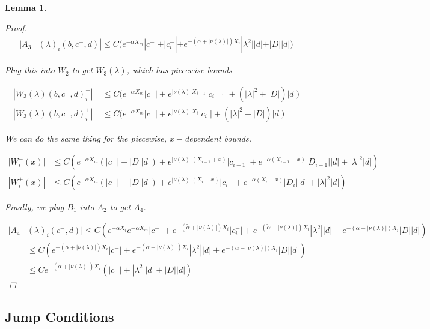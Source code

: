 \documentclass[12pt]{article}
\newtheorem{lemma}{Lemma}
\begin{document}
\begin{lemma}
\begin{proof}
\begin{align*}
|A_3&(\lambda)_i(b, c^-, d)|
\leq C \Big( e^{-\alpha X_m} |c^-| + |c_i^-| + e^{-(\tilde{\alpha}+|\nu(\lambda)|) X_i} |\lambda^2| |d| + |D||d| \Big)
\end{align*} 

Plug this into $W_2$ to get $W_3(\lambda)$, which has piecewise bounds

\begin{align*}
|W_3(\lambda)(b,c^-,d)_i^-|| &\leq C \Big( e^{-\alpha X_m} |c^-| + e^{|\nu(\lambda)|X_{i-1}}|c_{i-1}^-| + (|\lambda|^2 + |D|)|d| \Big) \\
|W_3(\lambda)(b,c^-,d)_i^+|| 
&\leq C \Big( e^{-\alpha X_m} |c^-| + e^{|\nu(\lambda)|X_i}|c_i^-| + (|\lambda|^2 + |D|)|d| \Big)
\end{align*}

We can do the same thing for the piecewise, $x-$dependent bounds.

\begin{align*}
|W_i^-(x)| &\leq C ( e^{-\alpha X_m}( |c^-| + |D||d|) + e^{|\nu(\lambda)|(X_{i-1} + x)} |c_{i-1}^-| + e^{-\tilde{\alpha}(X_{i-1} + x)}|D_{i-1}||d| + |\lambda|^2 |d| ) \\
|W_i^+(x)| &\leq C ( e^{-\alpha X_m}( |c^-| + |D||d|) + e^{|\nu(\lambda)|(X_i - x)} |c_i^-| + e^{-\tilde{\alpha}(X_i - x)}|D_i||d| + |\lambda|^2 |d| )
\end{align*}

Finally, we plug $B_1$ into $A_2$ to get $A_4$.

\begin{align*}
|A_4&(\lambda)_i(c^-, d)| \leq C ( e^{-\alpha X_i} e^{-\alpha X_m}|c^-| + e^{-(\tilde{\alpha} + |\nu(\lambda)|)X_i} |c_i^-| 
+ e^{-(\tilde{\alpha} + |\nu(\lambda)|) X_i} |\lambda^2| |d| + e^{-(\alpha - |\nu(\lambda)|) X_i}|D||d| ) \\
&\leq C ( e^{-(\tilde{\alpha} + |\nu(\lambda)|)X_i} |c^-| 
+ e^{-(\tilde{\alpha} + |\nu(\lambda)|) X_i} |\lambda^2| |d| + e^{-(\alpha - |\nu(\lambda)|) X_i}|D||d| ) \\
&\leq C e^{-(\tilde{\alpha} + |\nu(\lambda)|)X_i} ( |c^-| + |\lambda^2| |d| + |D||d| )
\end{align*}

\end{proof}
\end{lemma}

\subsection{Jump Conditions}
\end{document}

